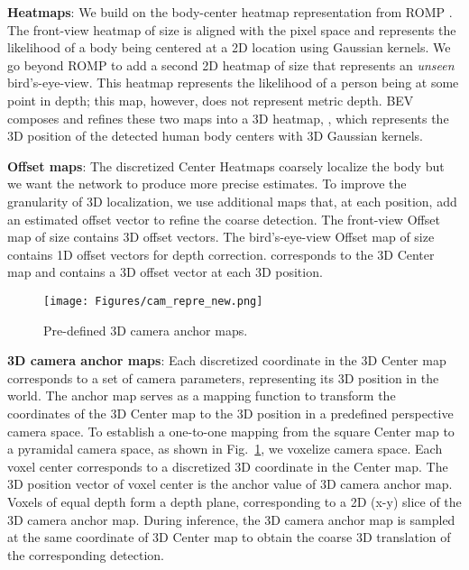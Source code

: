\documentclass[10pt,twocolumn,letterpaper]{article}
\begin{document}
\textbf{Heatmaps}:
We build on the body-center heatmap representation from ROMP \cite{romp}.
The front-view heatmap of size  is aligned with the pixel space and represents the likelihood of a body being centered at a 2D location using Gaussian kernels.
We go beyond ROMP to add a second 2D heatmap of size  that represents an {\em unseen} bird's-eye-view.
This heatmap represents the likelihood of a person being at some point in depth; this map, however, does not represent metric depth.
BEV composes and refines these two maps into a 3D heatmap, , which represents the 3D position of the detected human body centers with 3D Gaussian kernels.




\textbf{Offset maps}:
The discretized Center Heatmaps coarsely localize the body but we want the network to produce more precise estimates.
To improve the granularity of 3D localization, we use additional maps that, at each position, add an estimated offset vector to refine the coarse detection.
The front-view Offset map of size  contains 3D offset vectors.
The bird's-eye-view Offset map of size  contains 1D offset vectors for depth correction.
 corresponds to the 3D Center map and contains a 3D offset vector at each 3D position.


\begin{figure}[t]
	\centerline{	\texttt{[image: Figures/cam\_repre\_new.png]}}
	\vspace{-0.1in}
	\caption{Pre-defined 3D camera anchor maps.}
	\label{fig:camera_anchors}\vspace{-3mm}
\end{figure}

\textbf{3D camera anchor maps}:
Each discretized coordinate in the 3D Center map corresponds to a set of camera parameters, representing its 3D position in the world.
The anchor map serves as a mapping function to transform the coordinates of the 3D Center map to the 3D position in a predefined perspective camera space.
To establish a one-to-one mapping from the square Center map to a pyramidal camera space, as shown in Fig.~\ref{fig:camera_anchors}, we voxelize camera space.
Each voxel center corresponds to a discretized 3D coordinate in the Center map.
The 3D position vector  of voxel center is the anchor value of 3D camera anchor map.
Voxels of equal depth form a depth plane, corresponding to a 2D (x-y) slice of the 3D camera anchor map.
During inference, the 3D camera anchor map is sampled at the same coordinate of 3D Center map to obtain the coarse 3D translation of the corresponding detection. 
\end{document}
